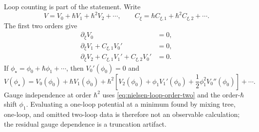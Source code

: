 Loop counting is part of the statement.  Write
\[
  V=V_0+\hbar V_1+\hbar^2V_2+\cdots,\qquad
  C_\xi=\hbar C_{\xi,1}+\hbar^2C_{\xi,2}+\cdots .
\]
The first two orders give
\begin{align}
  \partial_\xi V_0&=0,
  \label{eq:nielsen-loop-order-zero}\\
  \partial_\xi V_1+C_{\xi,1}V_0'&=0,
  \label{eq:nielsen-loop-order-one}\\
  \partial_\xi V_2+C_{\xi,1}V_1'+C_{\xi,2}V_0'&=0 .
  \label{eq:nielsen-loop-order-two}
\end{align}
If \(\phi_\star=\phi_0+\hbar\phi_1+\cdots\), then \(V_0'(\phi_0)=0\) and
\[
  V(\phi_\star)
  =
  V_0(\phi_0)
  +
  \hbar V_1(\phi_0)
  +
  \hbar^2
  \left[
    V_2(\phi_0)
    +
    \phi_1V_1'(\phi_0)
    +
    \frac12\phi_1^2V_0''(\phi_0)
  \right]
  +\cdots .
\]
Gauge independence at order \(\hbar^2\) uses
\eqref{eq:nielsen-loop-order-two} and the order-\(\hbar\) shift
\(\phi_1\).  Evaluating a one-loop potential at a minimum found by mixing
tree, one-loop, and omitted two-loop data is therefore not an observable
calculation; the residual gauge dependence is a truncation artifact.

